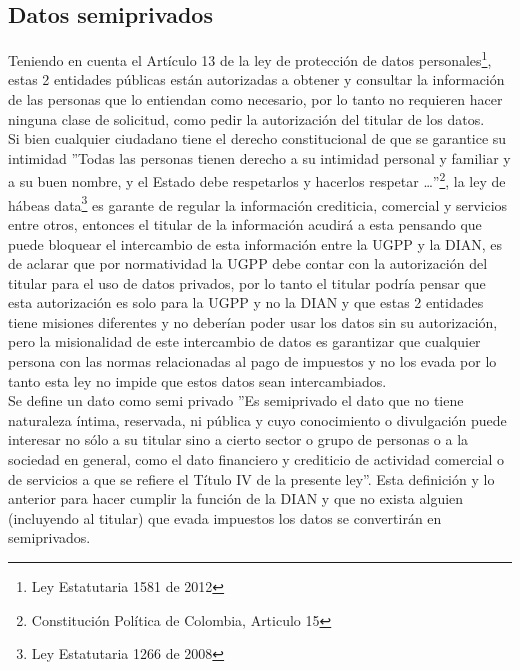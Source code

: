 \documentclass[
letterpaper,
12pt,
singlespacing,
headsepline]{article}
\begin{document}
\subsection{Datos semiprivados}
\label{subsec:semiprivados}
Teniendo en cuenta el Artículo 13 de la ley de protección de datos personales\footnote{Ley Estatutaria 1581 de 2012}, estas 2 entidades públicas están autorizadas a obtener y consultar la información de las personas que lo entiendan como necesario, por lo tanto no requieren hacer ninguna clase de solicitud, como pedir la autorización del titular de los datos.
\\
Si bien cualquier ciudadano tiene el derecho constitucional de que se garantice su intimidad ''Todas las personas tienen derecho a su intimidad personal y familiar y a su  buen nombre, y el Estado debe respetarlos y hacerlos respetar \dots''\footnote{Constitución Política de Colombia, Articulo 15}, la ley de hábeas data\footnote{Ley Estatutaria 1266 de 2008} es garante de regular la información crediticia, comercial y servicios entre otros, entonces el titular de la información acudirá a esta pensando que puede bloquear el intercambio de esta información entre la UGPP y la DIAN, es de aclarar que por normatividad la UGPP debe contar con la autorización del titular para el uso de datos privados, por lo tanto el titular podría pensar que esta autorización es solo para la UGPP y no la DIAN y que estas 2 entidades tiene misiones diferentes y no deberían poder usar los datos sin su autorización, pero la misionalidad de este intercambio de datos es garantizar que cualquier persona con las normas relacionadas al pago de impuestos y no los evada por lo tanto esta ley no impide que estos datos sean intercambiados.
\\
Se define un dato como semi privado ''Es semiprivado el dato que no tiene naturaleza íntima, reservada, ni pública y cuyo conocimiento o divulgación puede interesar no sólo a su titular sino a cierto sector o grupo de personas o a la sociedad en general, como el dato financiero y crediticio de actividad comercial o de servicios a que se refiere el Título IV de la presente ley''. Esta definición y lo anterior para hacer cumplir la función de la DIAN y que no exista alguien (incluyendo al titular) que evada impuestos los datos se convertirán en semiprivados.




\printbibliography[heading=bibintoc]
\end{document}
